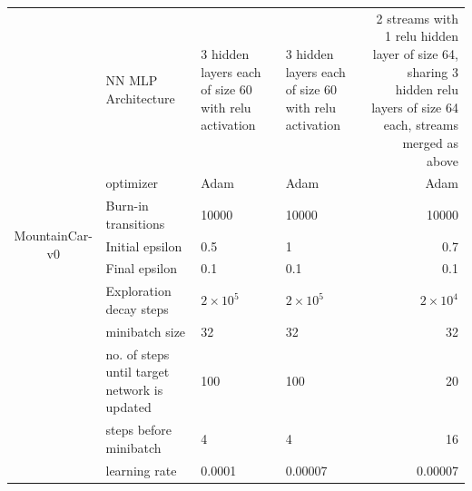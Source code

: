\documentclass[12pt]{article}
\begin{document}
\begin{tcolorbox}[fit,height=22cm, width=\textwidth, blank, borderline={1pt}{-2pt},nobeforeafter]
\begin{table}[H]
\begin{tabular}{|c|p{7.785em}|l|l|r|}
			\hline
			\multirow{10}[20]{*}{\begin{sideways}MountainCar-v0\end{sideways}} & NN MLP Architecture  & \multicolumn{1}{p{7.93em}|}{3 hidden layers each of size 60 with relu activation} & \multicolumn{1}{p{7.93em}|}{3 hidden layers each of size 60 with relu activation} & \multicolumn{1}{p{7.93em}|}{\footnotesize 2 streams with 1 relu hidden layer of size 64, sharing 3 hidden relu layers of size 64 each, streams merged as above} \\
			\cline{2-5}          & optimizer & \multicolumn{1}{p{7.93em}|}{Adam} & \multicolumn{1}{p{7.93em}|}{Adam} & \multicolumn{1}{p{7.93em}|}{Adam} \\
			\cline{2-5}          & Burn-in transitions & 10000 & 10000 & 10000 \\
			\cline{2-5}          & Initial epsilon & 0.5   & 1     & 0.7  \\
			\cline{2-5}          & Final epsilon & 0.1   & 0.1   &  0.1 \\
			\cline{2-5}          & Exploration decay steps & \multicolumn{1}{p{7.93em}|}{$2\times10^5$} & \multicolumn{1}{p{7.93em}|}{$2\times10^5$} & \multicolumn{1}{p{7.93em}|}{$2\times10^4$} \\
			\cline{2-5}          & minibatch size & 32    & 32    & 32 \\
			\cline{2-5}          & no. of steps until target network is updated & 100   & 100   & 20 \\
			\cline{2-5}          & steps before minibatch & 4     & 4     & 16 \\
			\cline{2-5}          & learning rate & 0.0001 & 0.00007 & 0.00007 \\
			\hline
		\end{tabular}%
		\label{tab1}%
	\end{table}%
     
    \end{tcolorbox}
\end{document}
